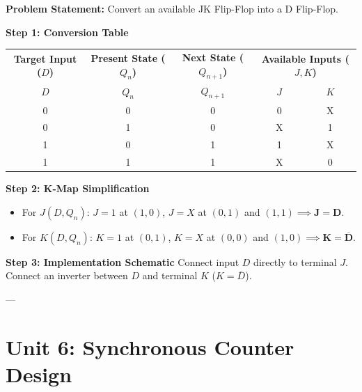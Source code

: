 \begin{example}
\textbf{Problem Statement:} Convert an available JK Flip-Flop into a D Flip-Flop.

\tcblower
\textbf{Step 1: Conversion Table}
\begin{center}
\small
\begin{tabular}{c|c|c|cc}
\toprule
\textbf{Target Input ($D$)} & \textbf{Present State ($Q_n$)} & \textbf{Next State ($Q_{n+1}$)} & \multicolumn{2}{c}{\textbf{Available Inputs ($J, K$)}} \\
$D$ & $Q_n$ & $Q_{n+1}$ & $J$ & $K$ \\
\midrule
0 & 0 & 0 & 0 & X \\
0 & 1 & 0 & X & 1 \\
1 & 0 & 1 & 1 & X \\
1 & 1 & 1 & X & 0 \\
\bottomrule
\end{tabular}
\end{center}

\textbf{Step 2: K-Map Simplification}
\begin{itemize}
    \item For $J(D, Q_n)$: $J = 1$ at $(1,0)$, $J = X$ at $(0,1)$ and $(1,1) \implies \mathbf{J = D}$.
    \item For $K(D, Q_n)$: $K = 1$ at $(0,1)$, $K = X$ at $(0,0)$ and $(1,0) \implies \mathbf{K = \overline{D}}$.
\end{itemize}

\textbf{Step 3: Implementation Schematic}
Connect input $D$ directly to terminal $J$. Connect an inverter between $D$ and terminal $K$ ($K = \overline{D}$).
\end{example}

---

\section{Unit 6: Synchronous Counter Design}

